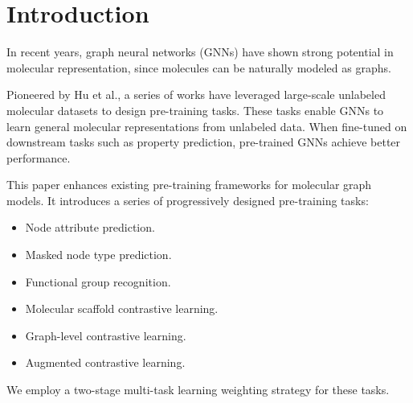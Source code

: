 \documentclass{article}
\theoremstyle{plain}
\theoremstyle{definition}
\theoremstyle{remark}
\begin{document}
\begin{abstract}
  This paper introduces GeAT (Graph edgewise-Attention Transformer), a Transformer-like molecular graph model architecture for molecular property prediction, along with a multi-task pre-training framework for molecular graph models. GeAT's pre-training incorporates multiple self-supervised learning tasks with a two-stage multi-task weighting strategy. This pre-training framework enables the model to learn general features from large-scale unlabeled molecular datasets. GeAT models edges as aggregation functions and computes attention scores for different bond types through an explicit edge-aware attention mechanism, allowing the model to learn bond-type-specific interaction patterns. GeAT achieves state-of-the-art performance across multiple benchmark datasets, demonstrating strong capabilities in molecular representation learning.
\end{abstract}

\section{Introduction}

In recent years, graph neural networks (GNNs) have shown strong potential in molecular representation, since molecules can be naturally modeled as graphs. 

Pioneered by Hu et al., a series of works have leveraged large-scale unlabeled molecular datasets to design pre-training tasks. These tasks enable GNNs to learn general molecular representations from unlabeled data. When fine-tuned on downstream tasks such as property prediction, pre-trained GNNs achieve better performance.

This paper enhances existing pre-training frameworks for molecular graph models.
It introduces a series of progressively designed pre-training tasks:
\begin{itemize}
\item Node attribute prediction.
\item Masked node type prediction.
\item Functional group recognition.
\item Molecular scaffold contrastive learning.
\item Graph-level contrastive learning.
\item Augmented contrastive learning.
\end{itemize}

We employ a two-stage multi-task learning weighting strategy for these tasks.  
\end{document}

